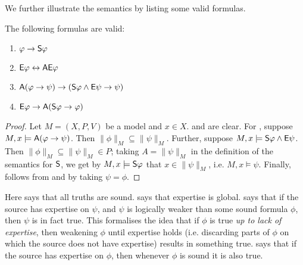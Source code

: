 We further illustrate the semantics by listing some valid formulas.

\begin{proposition}
\label{prop_validities}

    The following formulas are valid:

    \begin{enumerate}\small
        \item\label{item_truths_sound} $\phi \limplies \S\phi$

        \item\label{item_e_global} $\E\phi \liff \A\E\phi$

        \item\label{item_weakening} $\A(\phi \limplies \psi) \limplies (\S\phi
        \land \E\psi \limplies \psi)$

        \item\label{item_e_and_s} $\E\phi \limplies \A(\S\phi \limplies \phi)$

    \end{enumerate}
\end{proposition}

\begin{proof}

    Let $M = (X, P, V)$ be a model and $x \in X$.  and
     are clear. For , suppose $M, x
    \models \A(\phi \limplies \psi)$. Then $\|\phi\|_M \subseteq \|\psi\|_M$.
    Further, suppose $M, x \models \S\phi \land \E\psi$. Then $\|\phi\|_M
    \subseteq \|\psi\|_M \in P$; taking $A = \|\psi\|_M$ in the definition of
    the semantics for $\S$, we get by $M, x \models \S\phi$ that $x \in
    \|\psi\|_M$, i.e. $M, x \models \psi$. Finally, 
    follows from  and  by taking
    $\psi = \phi$.

\end{proof}

Here  says that all truths are sound.
 says that expertise is global.  says
that if the source has expertise on $\psi$, and $\psi$ is logically weaker than
some sound formula $\phi$, then $\psi$ is in fact true. This formalises the
idea that if $\phi$ is true \emph{up to lack of expertise}, then weakening
$\phi$ until expertise holds (i.e. discarding parts of $\phi$ on which the
source does not have expertise) results in something true. 
says that if the source has expertise on $\phi$, then whenever $\phi$ is sound
it is also true.

